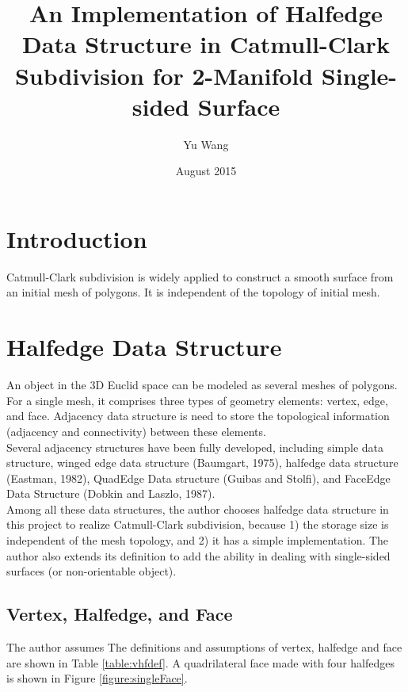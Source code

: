 \documentclass[12pt]{article}
\title{An Implementation of Halfedge Data Structure in Catmull-Clark 
Subdivision for 2-Manifold Single-sided Surface}
\author{Yu Wang}
\date{August 2015}
\begin{document}
\maketitle
\newpage


\section{Introduction}
Catmull-Clark subdivision is widely applied to construct a smooth surface from an initial mesh of polygons. It is independent of the topology of initial mesh.
\section{Halfedge Data Structure} \label{sec:halfedge}

An object in the 3D Euclid space can be modeled as several meshes of polygons. For a single mesh, it comprises three types of geometry elements: vertex, edge, and face. Adjacency data structure is need to store the topological information (adjacency and connectivity) between these elements.\\
Several adjacency structures have been fully developed, including simple data structure, winged edge data structure (Baumgart, 1975), halfedge data structure (Eastman, 1982), QuadEdge Data structure (Guibas and Stolfi), and FaceEdge Data Structure (Dobkin and Laszlo, 1987).\\
Among all these data structures, the author chooses halfedge data structure in this project to realize Catmull-Clark subdivision, because 1) the storage size is independent of the mesh topology, and 2) it has a simple implementation. The author also extends its definition to add the ability in dealing with single-sided surfaces (or non-orientable object).

\subsection{Vertex, Halfedge, and Face}

The author assumes The definitions and assumptions of vertex, halfedge and face are shown in Table \ref{table:vhfdef}. A quadrilateral face made with four halfedges 
is shown in Figure \ref{figure:singleFace}.
\end{document}
